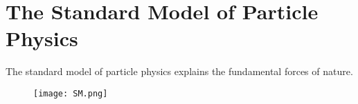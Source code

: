 \section{The Standard Model of Particle Physics}

The standard model of particle physics explains the fundamental forces of nature.

\begin{figure}[h]
  \centering
  \texttt{[image: SM.png]}
\end{figure}
